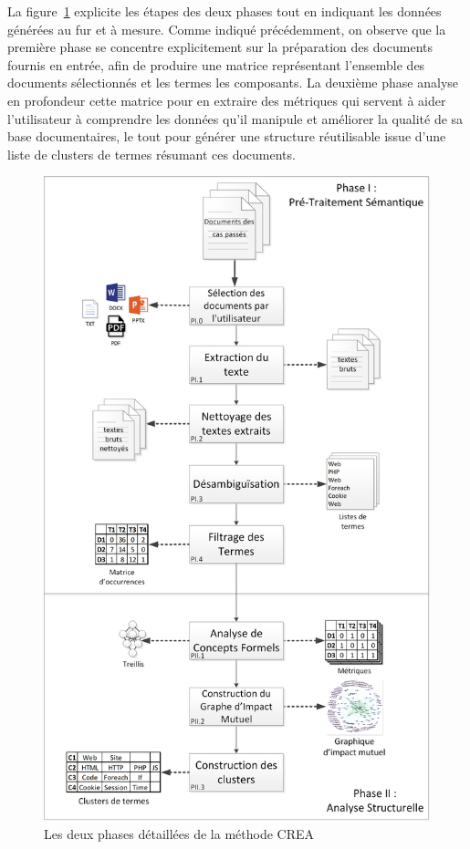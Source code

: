 \bigskip

La figure~\ref{figure:3-MethodeGeneraleFinale} explicite les étapes des deux phases tout en indiquant les données générées au fur et à mesure.
Comme indiqué précédemment, on observe que la première phase se concentre explicitement sur la préparation des documents fournis en entrée, afin de produire une matrice représentant l'ensemble des documents sélectionnés et les termes les composants.
La deuxième phase analyse en profondeur cette matrice pour en extraire des métriques qui servent à aider l'utilisateur à comprendre les données qu'il manipule et améliorer la qualité de sa base documentaires, le tout pour générer une structure réutilisable issue d'une liste de clusters de termes résumant ces documents.


\begin{figure}[ht!]
\centering
\centerline{  %
\includegraphics[scale=0.6]{3-Methode-CREA/images/schema_final.png}
}
\caption{Les deux phases détaillées de la méthode CREA}
\label{figure:3-MethodeGeneraleFinale}
\end{figure}
